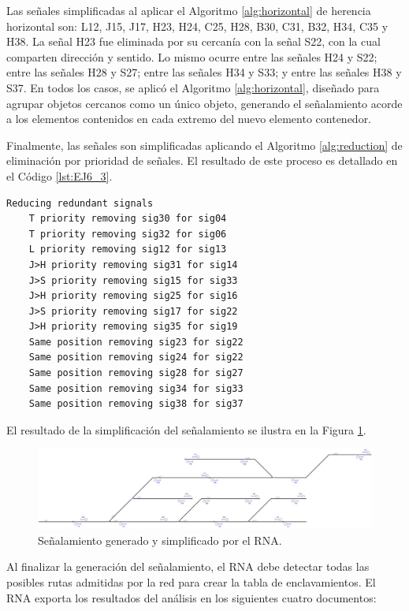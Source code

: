 	Las señales simplificadas al aplicar el Algoritmo \ref{alg:horizontal} de herencia horizontal son: L12, J15, J17, H23, H24, C25, H28, B30, C31, B32, H34, C35 y H38. La señal H23 fue eliminada por su cercanía con la señal S22, con la cual comparten dirección y sentido. Lo mismo ocurre entre las señales H24 y S22; entre las señales H28 y S27; entre las señales H34 y S33; y entre las señales H38 y S37. En todos los casos, se aplicó el Algoritmo \ref{alg:horizontal}, diseñado para agrupar objetos cercanos como un único objeto, generando el señalamiento acorde a los elementos contenidos en cada extremo del nuevo elemento contenedor.
	
	Finalmente, las señales son simplificadas aplicando el Algoritmo \ref{alg:reduction} de eliminación por prioridad de señales. El resultado de este proceso es detallado en el Código \ref{lst:EJ6_3}.
	
	\begin{lstlisting}[language = {}, caption = Reducción de señalamiento por prioridad de señales, label = {lst:EJ6_3}]
	Reducing redundant signals
	T priority removing sig30 for sig04
	T priority removing sig32 for sig06
	L priority removing sig12 for sig13
	J>H priority removing sig31 for sig14
	J>S priority removing sig15 for sig33
	J>H priority removing sig25 for sig16
	J>S priority removing sig17 for sig22
	J>H priority removing sig35 for sig19
	Same position removing sig23 for sig22
	Same position removing sig24 for sig22
	Same position removing sig28 for sig27
	Same position removing sig34 for sig33
	Same position removing sig38 for sig37
	\end{lstlisting}

	El resultado de la simplificación del señalamiento se ilustra en la Figura \ref{fig:EJ6_7}.
	
	 \begin{figure}[H]
		\centering
		\includegraphics[width=1\textwidth]{resultados-obtenidos/ejemplo6/images/6_RNA.png}
		\centering\caption{Señalamiento generado y simplificado por el RNA.}
		\label{fig:EJ6_7}
	\end{figure}

	Al finalizar la generación del señalamiento, el RNA debe detectar todas las posibles rutas admitidas por la red para crear la tabla de enclavamientos. El RNA exporta los resultados del análisis en los siguientes cuatro documentos:
	

